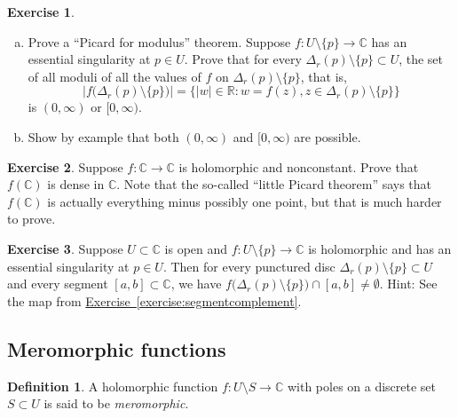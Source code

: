 \documentclass[12pt,openany]{book}
\newcommand{\sabs}[1]{\lvert {#1} \rvert}
\newcommand{\abs}[1]{\left\lvert {#1} \right\rvert}
\newcommand{\C}{{\mathbb{C}}}
\newcommand{\R}{{\mathbb{R}}}
\newcommand{\myindex}[1]{#1\index{#1}}
\theoremstyle{plain}
\theoremstyle{remark}
\theoremstyle{definition}
\newtheorem{defn}[thm]{Definition}
\newenvironment{exbox}{%
    \def\FrameCommand{\vrule width 1pt \relax\hspace{10pt}}%
    \MakeFramed{\advance\hsize-\width\FrameRestore}%
}{%
    \endMakeFramed
}
\newenvironment{exparts}{%
    \leavevmode\begin{enumerate}[a),noitemsep,topsep=0pt,parsep=0pt,partopsep=0pt]
}{%
    \end{enumerate}
}
\theoremstyle{exercise}
\newtheorem{exercise}{Exercise}[section]
\theoremstyle{example}
\newcommand{\exerciseref}[1]{\hyperref[#1]{Exercise~\ref*{#1}}}
\begin{document}
\begin{exbox}
\begin{exercise}
\begin{exparts}
\item
Prove a ``Picard for modulus'' theorem.
Suppose $f \colon U \setminus \{ p \} \to \C$ has an essential singularity
at $p \in U$.
Prove that
for every 
$\Delta_r(p) \setminus \{ p \} \subset U$, the set
of all moduli of all the values of $f$ on $\Delta_r(p) \setminus \{ p \}$,
that is,
\begin{equation*}
\abs{f\bigl(\Delta_r(p) \setminus \{ p \} \bigr)}
=
\bigl\{ \sabs{w} \in \R : w = f(z), z \in \Delta_r(p) \setminus \{ p \}
\bigr\}
\end{equation*}
is $(0,\infty)$ or $[0,\infty)$.
\item
Show by example that both $(0,\infty)$ and $[0,\infty)$ are possible.
\end{exparts}
\end{exercise}

\begin{exercise}
Suppose $f \colon \C \to \C$ is holomorphic and nonconstant.  Prove that $f(\C)$ is dense in
$\C$.  Note that the so-called ``little Picard theorem'' says that $f(\C)$
is actually everything minus possibly one point, but that is much harder to
prove.
\end{exercise}

\begin{exercise}
Suppose $U \subset \C$ is open and $f \colon U \setminus \{ p \} \to \C$ is
holomorphic and has
an essential singularity at $p \in U$.  Then for every punctured disc
$\Delta_r(p) \setminus \{ p \} \subset U$ and every segment $[a,b] \subset
\C$, we have
$f\bigl(\Delta_r(p) \setminus \{ p \} \bigr) \cap [a,b] \not= \emptyset$.
Hint: See the map from
\exerciseref{exercise:segmentcomplement}.
\end{exercise}
\end{exbox}


\subsection{Meromorphic functions}
\label{subsec:meromorphic}

\begin{defn}
A holomorphic function $f \colon U \setminus S \to \C$ with poles on a
discrete set $S \subset U$ is said to be \emph{\myindex{meromorphic}}.
\end{defn}
\end{document}
